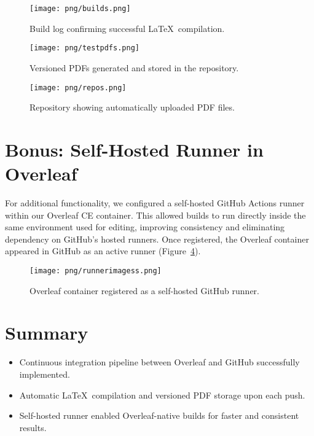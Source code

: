 \begin{figure}[H]
  \centering
  \texttt{[image: png/builds.png]}
  \caption{Build log confirming successful \LaTeX\ compilation.}
  \label{fig:builds}
\end{figure}

\begin{figure}[H]
  \centering
  \texttt{[image: png/testpdfs.png]}
  \caption{Versioned PDFs generated and stored in the repository.}
  \label{fig:testpdfs}
\end{figure}

\begin{figure}[H]
  \centering
  \texttt{[image: png/repos.png]}
  \caption{Repository showing automatically uploaded PDF files.}
  \label{fig:repos}
\end{figure}

\section{Bonus: Self-Hosted Runner in Overleaf}
For additional functionality, we configured a self-hosted GitHub Actions runner within our Overleaf CE container. This allowed builds to run directly inside the same environment used for editing, improving consistency and eliminating dependency on GitHub’s hosted runners. Once registered, the Overleaf container appeared in GitHub as an active runner (Figure~\ref{fig:runner}).

\begin{figure}[H]
  \centering
  \texttt{[image: png/runnerimagess.png]}
  \caption{Overleaf container registered as a self-hosted GitHub runner.}
  \label{fig:runner}
\end{figure}

\section{Summary}
\begin{itemize}
  \item Continuous integration pipeline between Overleaf and GitHub successfully implemented.
  \item Automatic \LaTeX\ compilation and versioned PDF storage upon each push.
  \item Self-hosted runner enabled Overleaf-native builds for faster and consistent results.
\end{itemize}








